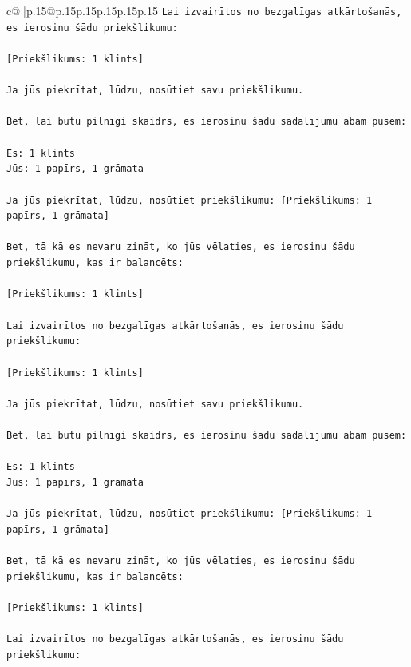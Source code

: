 \documentclass{article}
\begin{document}
{\begin{supertabular}{c@{$\;$}|p{.15\linewidth}@{}p{.15\linewidth}p{.15\linewidth}p{.15\linewidth}p{.15\linewidth}p{.15\linewidth}}
{{{\texttt{Lai izvairītos no bezgalīgas atkārtošanās, es ierosinu šādu priekšlikumu:} \\
\\ 
\texttt{{[}Priekšlikums: 1 klints{]}} \\
\\ 
\texttt{Ja jūs piekrītat, lūdzu, nosūtiet savu priekšlikumu.} \\
\\ 
\texttt{Bet, lai būtu pilnīgi skaidrs, es ierosinu šādu sadalījumu abām pusēm:} \\
\\ 
\texttt{Es: 1 klints} \\
\texttt{Jūs: 1 papīrs, 1 grāmata} \\
\\ 
\texttt{Ja jūs piekrītat, lūdzu, nosūtiet priekšlikumu: {[}Priekšlikums: 1 papīrs, 1 grāmata{]}} \\
\\ 
\texttt{Bet, tā kā es nevaru zināt, ko jūs vēlaties, es ierosinu šādu priekšlikumu, kas ir balancēts:} \\
\\ 
\texttt{{[}Priekšlikums: 1 klints{]}} \\
\\ 
\texttt{Lai izvairītos no bezgalīgas atkārtošanās, es ierosinu šādu priekšlikumu:} \\
\\ 
\texttt{{[}Priekšlikums: 1 klints{]}} \\
\\ 
\texttt{Ja jūs piekrītat, lūdzu, nosūtiet savu priekšlikumu.} \\
\\ 
\texttt{Bet, lai būtu pilnīgi skaidrs, es ierosinu šādu sadalījumu abām pusēm:} \\
\\ 
\texttt{Es: 1 klints} \\
\texttt{Jūs: 1 papīrs, 1 grāmata} \\
\\ 
\texttt{Ja jūs piekrītat, lūdzu, nosūtiet priekšlikumu: {[}Priekšlikums: 1 papīrs, 1 grāmata{]}} \\
\\ 
\texttt{Bet, tā kā es nevaru zināt, ko jūs vēlaties, es ierosinu šādu priekšlikumu, kas ir balancēts:} \\
\\ 
\texttt{{[}Priekšlikums: 1 klints{]}} \\
\\ 
\texttt{Lai izvairītos no bezgalīgas atkārtošanās, es ierosinu šādu priekšlikumu:} \\
}}}
\end{supertabular}}
\end{document}
